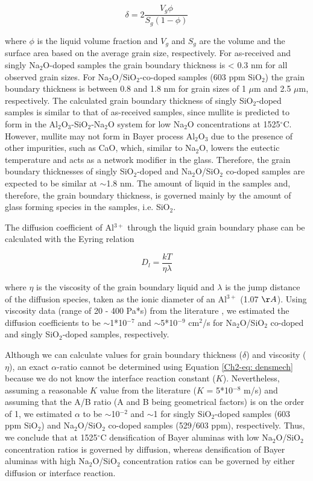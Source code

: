 \begin{equation}
\label{Ch2-eq: gbthickness}
\delta = 2 \frac{V_{g} \phi}{S_{g} \left(1-\phi\right)}
\end{equation}

\noindent where $\phi$ is the liquid volume fraction and $V_{g}$ and $S_{g}$ are the volume and the surface area based on the average grain size, respectively. For as-received and singly Na$_{2}$O-doped samples the grain boundary thickness is < 0.3 nm for all observed grain sizes. For Na$_{2}$O/SiO$_{2}$-co-doped samples (603 ppm SiO$_{2}$) the grain boundary thickness is between 0.8 and 1.8 nm for grain sizes of 1 $\mu$m and 2.5 $\mu$m, respectively. The calculated grain boundary thickness of singly SiO$_{2}$-doped samples is similar to that of as-received samples, since mullite is predicted to form in the Al$_{2}$O$_{3}$-SiO$_{2}$-Na$_{2}$O system for low Na$_{2}$O concentrations at 1525$^{\circ}$C. However, mullite may not form in Bayer process Al$_{2}$O$_{3}$ due to the presence of other impurities, such as CaO, which, similar to Na$_{2}$O, lowers the eutectic temperature and acts as a network modifier in the glass. Therefore, the grain boundary thicknesses of singly SiO$_{2}$-doped and Na$_{2}$O/SiO$_{2}$ co-doped samples are expected to be similar at $\sim$1.8 nm. The amount of liquid in the samples and, therefore, the grain boundary thickness, is governed mainly by the amount of glass forming species in the samples, i.e. SiO$_{2}$.

The diffusion coefficient of Al$^{3+}$ through the liquid grain boundary phase can be calculated with the Eyring relation

\begin{equation}
\label{Ch2-eq: eyring}
D_{l} = \frac{kT}{\eta \lambda}
\end{equation}

\noindent where $\eta$ is the viscosity of the grain boundary liquid and $\lambda$ is the jump distance of the diffusion species, taken as the ionic diameter of an Al$^{3+}$ (1.07 $\AA$). Using viscosity data (range of 20 - 400 Pa*s) from the literature \cite{Wu2015}, we estimated the diffusion coefficients to be $\sim$1*10$^{-7}$ and $\sim$5*10$^{-9}$ cm$^{2}$/s for Na$_{2}$O/SiO$_{2}$ co-doped and singly SiO$_{2}$-doped samples, respectively.

Although we can calculate values for grain boundary thickness ($\delta$) and viscosity ($\eta$), an exact $\alpha$-ratio cannot be determined using Equation \ref{Ch2-eq: densmech} because we do not know the interface reaction constant ($K$). Nevertheless, assuming a reasonable $K$ value from the literature ($K$ = 5*10$^{-8}$ m/s) \cite{Kwon1991} and assuming that the A/B ratio (A and B being geometrical factors) is on the order of 1, we estimated $\alpha$ to be $\sim$10$^{-2}$ and $\sim$1 for singly SiO$_{2}$-doped samples (603 ppm SiO$_{2}$) and Na$_{2}$O/SiO$_{2}$ co-doped samples (529/603 ppm), respectively. Thus, we conclude that at 1525$^{\circ}$C densification of Bayer aluminas with low Na$_{2}$O/SiO$_{2}$ concentration ratios is governed by diffusion, whereas densification of Bayer aluminas with high Na$_{2}$O/SiO$_{2}$ concentration ratios can be governed by either diffusion or interface reaction. 

